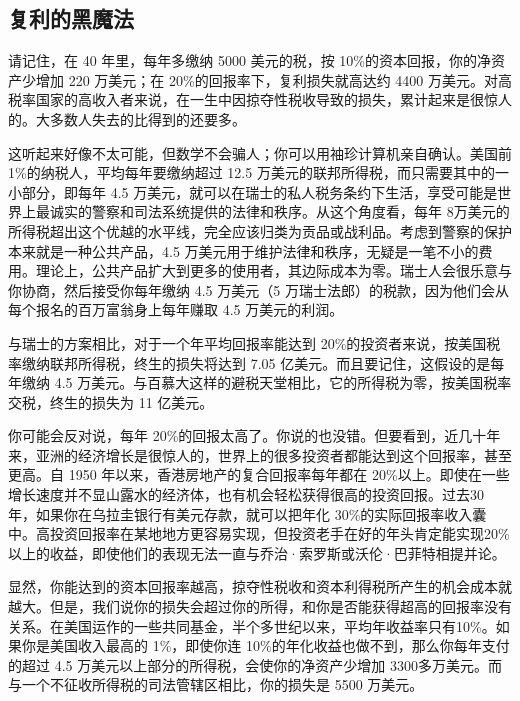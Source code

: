\subsection{复利的黑魔法}
请记住，在 40 年里，每年多缴纳 5000 美元的税，按 10\%的资本回报，你的净资产少增加 220 万美元；在 20\%的回报率下，复利损失就高达约 4400 万美元。对高税率国家的高收入者来说，在一生中因掠夺性税收导致的损失，累计起来是很惊人的。大多数人失去的比得到的还要多。

这听起来好像不太可能，但数学不会骗人；你可以用袖珍计算机亲自确认。美国前 1\%的纳税人，平均每年要缴纳超过 12.5 万美元的联邦所得税，而只需要其中的一小部分，即每年 4.5 万美元，就可以在瑞士的私人税务条约下生活，享受可能是世界上最诚实的警察和司法系统提供的法律和秩序。从这个角度看，每年 8万美元的所得税超出这个优越的水平线，完全应该归类为贡品或战利品。考虑到警察的保护本来就是一种公共产品，4.5 万美元用于维护法律和秩序，无疑是一笔不小的费用。理论上，公共产品扩大到更多的使用者，其边际成本为零。瑞士人会很乐意与你协商，然后接受你每年缴纳 4.5 万美元（5 万瑞士法郎）的税款，因为他们会从每个报名的百万富翁身上每年赚取 4.5 万美元的利润。

与瑞士的方案相比，对于一个年平均回报率能达到 20\%的投资者来说，按美国税率缴纳联邦所得税，终生的损失将达到 7.05 亿美元。而且要记住，这假设的是每年缴纳 4.5 万美元。与百慕大这样的避税天堂相比，它的所得税为零，按美国税率交税，终生的损失为 11 亿美元。

你可能会反对说，每年 20\%的回报太高了。你说的也没错。但要看到，近几十年来，亚洲的经济增长是很惊人的，世界上的很多投资者都能达到这个回报率，甚至更高。自 1950 年以来，香港房地产的复合回报率每年都在 20\%以上。即使在一些增长速度并不显山露水的经济体，也有机会轻松获得很高的投资回报。过去30 年，如果你在乌拉圭银行有美元存款，就可以把年化 30\%的实际回报率收入囊中。高投资回报率在某地地方更容易实现，但投资老手在好的年头肯定能实现20\%以上的收益，即使他们的表现无法一直与乔治·索罗斯或沃伦·巴菲特相提并论。

显然，你能达到的资本回报率越高，掠夺性税收和资本利得税所产生的机会成本就越大。但是，我们说你的损失会超过你的所得，和你是否能获得超高的回报率没有关系。在美国运作的一些共同基金，半个多世纪以来，平均年收益率只有10\%。如果你是美国收入最高的 1\%，即使你连 10\%的年化收益也做不到，那么你每年支付的超过 4.5 万美元以上部分的所得税，会使你的净资产少增加 3300多万美元。而与一个不征收所得税的司法管辖区相比，你的损失是 5500 万美元。

